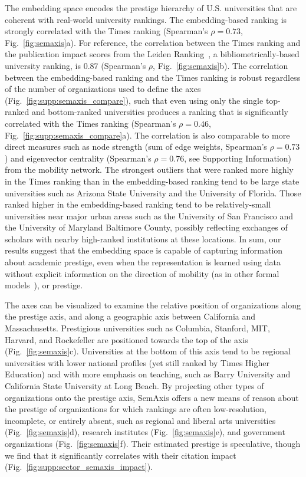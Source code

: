 \documentclass[12pt]{article} %
\def\SI{Supporting Information}
\begin{document}
The embedding space encodes the prestige hierarchy of U.S. universities that are coherent with real-world university rankings.
The embedding-based ranking is strongly correlated with the Times ranking (Spearman's $\rho = 0.73$, Fig.~\ref{fig:semaxis}a).
For reference, the correlation between the Times ranking and the publication impact scores from the Leiden Ranking~\autocite{waltman2012leidenrankings}, a bibliometrically-based university ranking, is 0.87 (Spearman's $\rho$, Fig.~\ref{fig:semaxis}b).
The correlation between the embedding-based ranking and the Times ranking is robust regardless of the number of organizations used to define the axes (Fig.~\ref{fig:supp:semaxis_compare}), such that even using only the single top-ranked and bottom-ranked universities produces a ranking that is significantly correlated with the Times ranking (Spearman's $\rho = 0.46$, Fig.~\ref{fig:supp:semaxis_compare}a).
The correlation is also comparable to more direct measures such as node strength (sum of edge weights, Spearman's $\rho = 0.73$) and eigenvector centrality (Spearman's $\rho = 0.76$, see \SI) from the mobility network.
The strongest outliers that were ranked more highly in the Times ranking than in the embedding-based ranking tend to be large state universities such as Arizona State University and the University of Florida.
Those ranked higher in the embedding-based ranking tend to be relatively-small universities near major urban areas such as the University of San Francisco and the University of Maryland Baltimore County, possibly reflecting exchanges of scholars with nearby high-ranked institutions at these locations.
In sum, our results suggest that the embedding space is capable of capturing information about academic prestige, even when the representation is learned using data without explicit information on the direction of mobility (as in other formal models~\autocite{clauset2015hierarchy}), or prestige.


The axes can be visualized to examine the relative position of organizations along the prestige axis, and along a geographic axis between California and Massachusetts.
Prestigious universities such as Columbia, Stanford, MIT, Harvard, and Rockefeller are positioned towards the top of the axis (Fig.~\ref{fig:semaxis}c).
Universities at the bottom of this axis tend to be regional universities with lower national profiles (yet still ranked by Times Higher Education) and with more emphasis on teaching, such as Barry University and California State University at Long Beach.
By projecting other types of organizations onto the prestige axis, SemAxis offers a new means of reason about the prestige of organizations for which rankings are often low-resolution, incomplete, or entirely absent, such as regional and liberal arts universities (Fig.~\ref{fig:semaxis}d), research institutes (Fig.~\ref{fig:semaxis}e), and government organizations (Fig.~\ref{fig:semaxis}f).
Their estimated prestige is speculative, though we find that it significantly correlates with their citation impact (Fig.~\ref{fig:supp:sector_semaxis_impact}).
\end{document}
